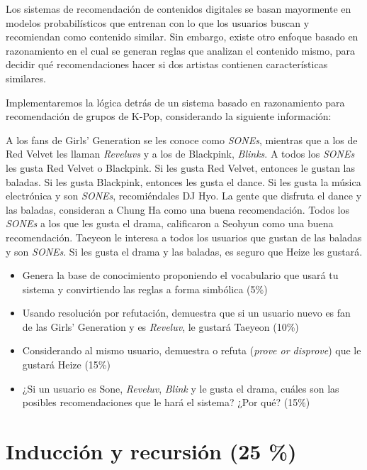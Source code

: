 \documentclass{article}
\begin{document}
Los sistemas de recomendación de contenidos digitales se basan mayormente en modelos probabilísticos que entrenan con lo que los usuarios buscan y recomiendan como contenido similar.
Sin embargo, existe otro enfoque basado en razonamiento en el cual se generan reglas que analizan el contenido mismo, para decidir qué recomendaciones hacer si dos artistas contienen características similares.

Implementaremos la lógica detrás de un sistema basado en razonamiento para recomendación de grupos de K-Pop, considerando la siguiente información:

\vspace{2ex}

A los fans de Girls' Generation se les conoce como \textit{SONEs}, mientras que a los de Red Velvet les llaman \textit{Reveluvs} y a los de Blackpink, \textit{Blinks}.
A todos los \textit{SONEs} les gusta Red Velvet o Blackpink.
Si les gusta Red Velvet, entonces le gustan las baladas.
Si les gusta Blackpink, entonces les gusta el dance.
Si les gusta la música electrónica y son \textit{SONEs}, recomiéndales DJ Hyo.
La gente que disfruta el dance y las baladas, consideran a Chung Ha como una buena recomendación.
Todos los \textit{SONEs} a los que les gusta el drama, calificaron a Seohyun como una buena recomendación.
Taeyeon le interesa a todos los usuarios que gustan de las baladas y son \textit{SONEs}.
Si les gusta el drama y las baladas, es seguro que Heize les gustará.

\pagebreak

\begin{itemize}
    \item Genera la base de conocimiento proponiendo el vocabulario que usará tu sistema y convirtiendo las reglas a forma simbólica (5\%)
    \item Usando resolución por refutación, demuestra que si un usuario nuevo es fan de las Girls' Generation y es \textit{Reveluv}, le gustará Taeyeon (10\%)
    \item Considerando al mismo usuario, demuestra o refuta (\textit{prove or disprove}) que le gustará Heize (15\%)
    \item ¿Si un usuario es Sone, \textit{Reveluv}, \textit{Blink} y le gusta el drama, cuáles son las posibles recomendaciones que le hará el sistema? ¿Por qué? (15\%)
\end{itemize}

\section{Inducción y recursión (25 \%)}
\end{document}
